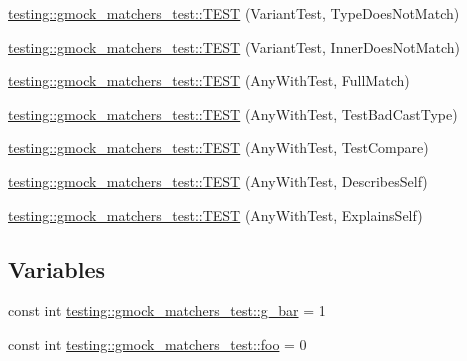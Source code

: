 \begin{DoxyCompactItemize}
\item 
\mbox{\hyperlink{namespacetesting_1_1gmock__matchers__test_a8658fa7df92e4f5476d583fd691b1b88}{testing\+::gmock\+\_\+matchers\+\_\+test\+::\+T\+E\+ST}} (Variant\+Test, Type\+Does\+Not\+Match)
\item 
\mbox{\hyperlink{namespacetesting_1_1gmock__matchers__test_a505e6c087c180d84af53caac65a19e85}{testing\+::gmock\+\_\+matchers\+\_\+test\+::\+T\+E\+ST}} (Variant\+Test, Inner\+Does\+Not\+Match)
\item 
\mbox{\hyperlink{namespacetesting_1_1gmock__matchers__test_a1e590af03119a576f0a1967ad0913e73}{testing\+::gmock\+\_\+matchers\+\_\+test\+::\+T\+E\+ST}} (Any\+With\+Test, Full\+Match)
\item 
\mbox{\hyperlink{namespacetesting_1_1gmock__matchers__test_a3cd540ce4eeb41c7f54469072bcfabac}{testing\+::gmock\+\_\+matchers\+\_\+test\+::\+T\+E\+ST}} (Any\+With\+Test, Test\+Bad\+Cast\+Type)
\item 
\mbox{\hyperlink{namespacetesting_1_1gmock__matchers__test_a028fccc8764077f9b8e2f37b012aaa70}{testing\+::gmock\+\_\+matchers\+\_\+test\+::\+T\+E\+ST}} (Any\+With\+Test, Test\+Compare)
\item 
\mbox{\hyperlink{namespacetesting_1_1gmock__matchers__test_a47e76f27901817ad3fb526172e6ecc00}{testing\+::gmock\+\_\+matchers\+\_\+test\+::\+T\+E\+ST}} (Any\+With\+Test, Describes\+Self)
\item 
\mbox{\hyperlink{namespacetesting_1_1gmock__matchers__test_a5e9f41e9a39a6de9c69d06250d62a67a}{testing\+::gmock\+\_\+matchers\+\_\+test\+::\+T\+E\+ST}} (Any\+With\+Test, Explains\+Self)
\end{DoxyCompactItemize}
\subsection*{Variables}
\begin{DoxyCompactItemize}
\item 
const int \mbox{\hyperlink{namespacetesting_1_1gmock__matchers__test_a55dcc962203a3a3361d2e7e00ed99b4d}{testing\+::gmock\+\_\+matchers\+\_\+test\+::g\+\_\+bar}} = 1
\item 
const int \mbox{\hyperlink{namespacetesting_1_1gmock__matchers__test_a3536e68112ffbb1f76887cd15bb45c15}{testing\+::gmock\+\_\+matchers\+\_\+test\+::foo}} = 0
\end{DoxyCompactItemize}
